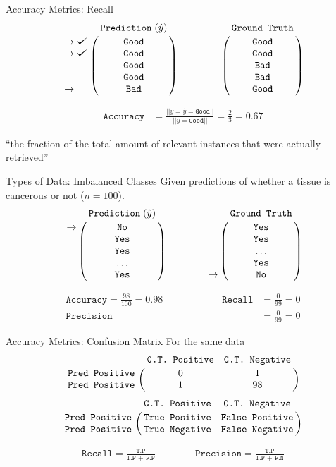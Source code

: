 \documentclass[usenames,dvipsnames]{beamer}
\def\checkmark{\tikz\fill[scale=0.4](0,.35) -- (.25,0) -- (1,.7) -- (.25,.15) -- cycle;}
\begin{document}
\begin{frame}{Accuracy Metrics: Recall}
$$
\bordermatrix{&\texttt{Prediction}\;(\hat{y})\cr
               \rightarrow\checkmark&\texttt{Good}\cr
               \rightarrow\checkmark&\texttt{Good}\cr
                &\texttt{Good}\cr
                &\texttt{Good}\cr
               \rightarrow&\texttt{Bad}}
\qquad \qquad
\bordermatrix{&\texttt{Ground Truth}\cr
                &\texttt{Good}\cr
                &\texttt{Good}\cr
                &\texttt{Bad}\cr
                &\texttt{Bad}\cr
                &\texttt{Good}}
$$

\begin{align*}
\texttt{Accuracy} &= \frac{||y = \hat{y} = \texttt{Good}||}{||y = \texttt{Good}||} = \frac{2}{3} = 0.67
\end{align*}

``the fraction of the total amount of relevant instances that were actually retrieved''

\end{frame}

\begin{frame}{Types of Data: Imbalanced Classes}
Given predictions of whether a tissue is cancerous or not ($n = 100$).
$$
\bordermatrix{&\texttt{Prediction}\;(\hat{y})\cr
               \rightarrow&\texttt{No}\cr
               &\texttt{Yes}\cr
                &\texttt{Yes}\cr
                &\ldots\cr
               &\texttt{Yes}}
\qquad \qquad
\bordermatrix{&\texttt{Ground Truth}\cr
                &\texttt{Yes}\cr
                &\texttt{Yes}\cr
                &\ldots\cr
                &\texttt{Yes}\cr
                \rightarrow&\texttt{No}}
$$

\begin{align*}
\texttt{Accuracy} = \frac{98}{100} = 0.98 \qquad \qquad \qquad
\texttt{Recall} &= \frac{0}{99} = 0 \\
\texttt{Precision} &= \frac{0}{99} = 0
\end{align*}


\end{frame}

\begin{frame}{Accuracy Metrics: Confusion Matrix}
For the same data
$$
\bordermatrix{&\texttt{G.T. Positive}&\texttt{G.T. Negative}\cr
               \texttt{Pred Positive}&0&1\cr
               \texttt{Pred Positive}&1&98}
$$
$$
\bordermatrix{&\texttt{G.T. Positive}&\texttt{G.T. Negative}\cr
               \texttt{Pred Positive}&\texttt{True Positive}&\texttt{False Positive}\cr
               \texttt{Pred Positive}&\texttt{True Negative}&\texttt{False Negative}}
$$


\begin{align*}
\texttt{Recall} = \frac{\texttt{T.P}}{\texttt{T.P + F.P}} \qquad \qquad 
\texttt{Precision} = \frac{\texttt{T.P}}{\texttt{T.P + F.N}}
\end{align*}
\end{frame}
\end{document}
